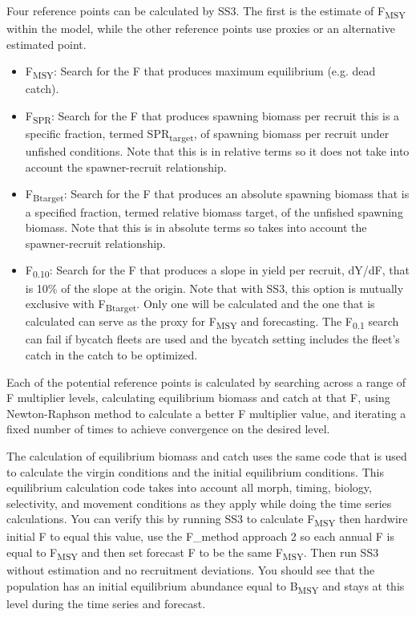 Four reference points can be calculated by SS3. The first is the estimate of F\textsubscript{MSY} within the model, while the other reference points use proxies or an alternative estimated point.

\begin{itemize}
	\item F\textsubscript{MSY}: Search for the F that produces maximum equilibrium (e.g. dead catch).
	
	\item F\textsubscript{SPR}: Search for the F that produces spawning biomass per recruit this is a specific fraction, termed SPR\textsubscript{target}, of spawning biomass per recruit under unfished conditions. Note that this is in relative terms so it does not take into account the spawner-recruit relationship.
	
	\item F\textsubscript{Btarget}: Search for the F that produces an absolute spawning biomass that is a specified fraction, termed relative biomass target, of the unfished spawning biomass. Note that this is in absolute terms so takes into account the spawner-recruit relationship. 
	
	\item F\textsubscript{0.10}: Search for the F that produces a slope in yield per recruit, dY/dF, that is 10\% of the slope at the origin. Note that with SS3, this option is mutually exclusive with F\textsubscript{Btarget}. Only one will be calculated and the one that is calculated can serve as the proxy for F\textsubscript{MSY} and forecasting. The F\textsubscript{0.1} search can fail if bycatch fleets are used and the bycatch setting includes the fleet's catch in the catch to be optimized.
\end{itemize}

Each of the potential reference points is calculated by searching across a range of F multiplier levels, calculating equilibrium biomass and catch at that F, using Newton-Raphson method to calculate a better F multiplier value, and iterating a fixed number of times to achieve convergence on the desired level.

The calculation of equilibrium biomass and catch uses the same code that is used to calculate the virgin conditions and the initial equilibrium conditions.  This equilibrium calculation code takes into account all morph, timing, biology, selectivity, and movement conditions as they apply while doing the time series calculations.  You can verify this by running SS3 to calculate F\textsubscript{MSY} then hardwire initial F to equal this value, use the F\_method approach 2 so each annual F is equal to F\textsubscript{MSY} and then set forecast F to be the same F\textsubscript{MSY}.  Then run SS3 without estimation and no recruitment deviations.  You should see that the population has an initial equilibrium abundance equal to B\textsubscript{MSY} and stays at this level during the time series and forecast.

